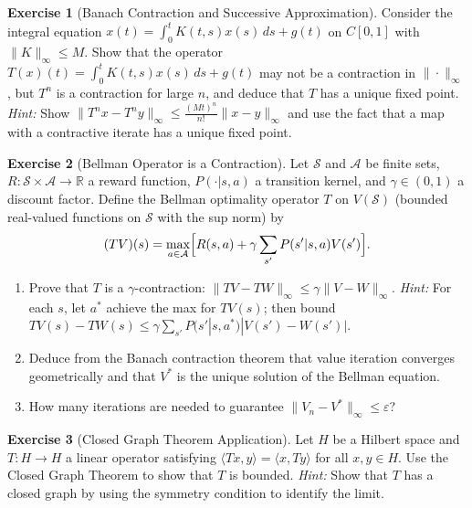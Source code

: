\documentclass[11pt,a4paper]{article}
\theoremstyle{definition}
\newtheorem{exercise}{Exercise}[section]
\theoremstyle{plain}
\theoremstyle{remark}
\newcommand{\R}{\mathbb{R}}
\begin{document}
\begin{exercise}[Banach Contraction and Successive Approximation]\label{ex:banach-ode}
Consider the integral equation $x(t) = \int_0^t K(t,s) x(s)\, ds + g(t)$ on
$C[0, 1]$ with $\|K\|_\infty \leq M$. Show that the operator
$T(x)(t) = \int_0^t K(t,s) x(s)\, ds + g(t)$ may not be a contraction in
$\|\cdot\|_\infty$, but $T^n$ is a contraction for large $n$, and deduce
that $T$ has a unique fixed point. \emph{Hint:} Show
$\|T^n x - T^n y\|_\infty \leq \frac{(Mt)^n}{n!} \|x - y\|_\infty$
and use the fact that a map with a contractive iterate has a unique fixed point.
\end{exercise}

\begin{exercise}[Bellman Operator is a Contraction]\label{ex:bellman-contraction}
Let $\mathcal{S}$ and $\mathcal{A}$ be finite sets, $R \colon \mathcal{S}
\times \mathcal{A} \to \R$ a reward function, $P(\cdot | s, a)$ a transition
kernel, and $\gamma \in (0, 1)$ a discount factor. Define the Bellman
optimality operator $T$ on $V(\mathcal{S})$ (bounded real-valued functions on
$\mathcal{S}$ with the sup norm) by
\[
    (TV)(s) = \max_{a \in \mathcal{A}}\Bigl[R(s,a) + \gamma \sum_{s'} P(s'|s,a) V(s')\Bigr].
\]
\begin{enumerate}[label=(\alph*)]
    \item Prove that $T$ is a $\gamma$-contraction:
          $\|TV - TW\|_\infty \leq \gamma \|V - W\|_\infty$.
          \emph{Hint:} For each $s$, let $a^*$ achieve the max for $TV(s)$;
          then bound $TV(s) - TW(s) \leq \gamma \sum_{s'} P(s'|s,a^*)|V(s') - W(s')|$.
    \item Deduce from the Banach contraction theorem that value iteration
          converges geometrically and that $V^*$ is the unique solution of
          the Bellman equation.
    \item How many iterations are needed to guarantee
          $\|V_n - V^*\|_\infty \leq \varepsilon$?
\end{enumerate}
\end{exercise}

\begin{exercise}[Closed Graph Theorem Application]\label{ex:closed-graph-app}
Let $H$ be a Hilbert space and $T \colon H \to H$ a linear operator satisfying
$\langle Tx, y \rangle = \langle x, Ty \rangle$ for all $x, y \in H$.
Use the Closed Graph Theorem to show that $T$ is bounded.
\emph{Hint:} Show that $T$ has a closed graph by using the symmetry condition
to identify the limit.
\end{exercise}
\end{document}
